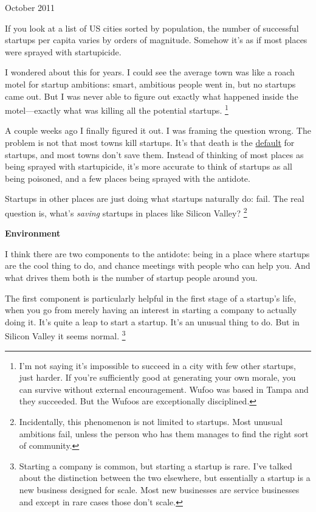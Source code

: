 \documentclass[12pt]{book}
\begin{document}
October 2011

If you look at a list of US cities sorted by population, the number of
successful startups per capita varies by orders of magnitude. Somehow
it's as if most places were sprayed with startupicide.

I wondered about this for years. I could see the average town was like a
roach motel for startup ambitions: smart, ambitious people went in, but
no startups came out. But I was never able to figure out exactly what
happened inside the motel---exactly what was killing all the potential
startups. \footnote{I'm not saying it's impossible to succeed in a city with few
other startups, just harder. If you're sufficiently good at generating
your own morale, you can survive without external encouragement. Wufoo
was based in Tampa and they succeeded. But the Wufoos are exceptionally
disciplined.}

A couple weeks ago I finally figured it out. I was framing the question
wrong. The problem is not that most towns kill startups. It's that death
is the \href{die.html}{default} for startups, and most towns don't save
them. Instead of thinking of most places as being sprayed with
startupicide, it's more accurate to think of startups as all being
poisoned, and a few places being sprayed with the antidote.

Startups in other places are just doing what startups naturally do:
fail. The real question is, what's \emph{saving} startups in places like
Silicon Valley? \footnote{Incidentally, this phenomenon is not limited to startups. Most
unusual ambitions fail, unless the person who has them manages to find
the right sort of community.}

\textbf{Environment}

I think there are two components to the antidote: being in a place where
startups are the cool thing to do, and chance meetings with people who
can help you. And what drives them both is the number of startup people
around you.

The first component is particularly helpful in the first stage of a
startup's life, when you go from merely having an interest in starting a
company to actually doing it. It's quite a leap to start a startup. It's
an unusual thing to do. But in Silicon Valley it seems normal.
\footnote{Starting a company is common, but starting a startup is rare.
I've talked about the distinction between the two elsewhere, but
essentially a startup is a new business designed for scale. Most new
businesses are service businesses and except in rare cases those don't
scale.}
\end{document}
